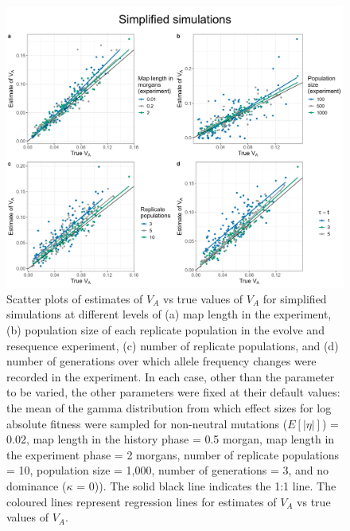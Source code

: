 \documentclass[12pt]{article}
\begin{document}
\begin{bibunit}
\begin{figure}[H]
\includegraphics[scale = 0.12]{Figures/simplified_params.jpg}
\caption{Scatter plots of estimates of $V_A$ vs true values of $V_A$ for simplified simulations at different levels of (a) map length in the experiment, (b) population size of each replicate population in the evolve and resequence experiment, (c) number of replicate populations, and (d) number of generations over which allele frequency changes were recorded in the experiment. In each case, other than the parameter to be varied, the other parameters were fixed at their default values: the mean of the gamma distribution from which effect sizes for log absolute fitness were sampled for non-neutral mutations ($E[|\eta|]$) = 0.02, map length in the history phase = 0.5 morgan, map length in the experiment phase = 2 morgans, number of replicate populations = 10, population size = 1,000, number of generations = 3, and no dominance ($\kappa$ = 0)). The solid black line indicates the 1:1 line. The coloured lines represent regression lines for estimates of $V_A$ vs true values of $V_A$.}
  \label{fig:simplified_params}
\end{figure}


\end{bibunit}
\end{document}
